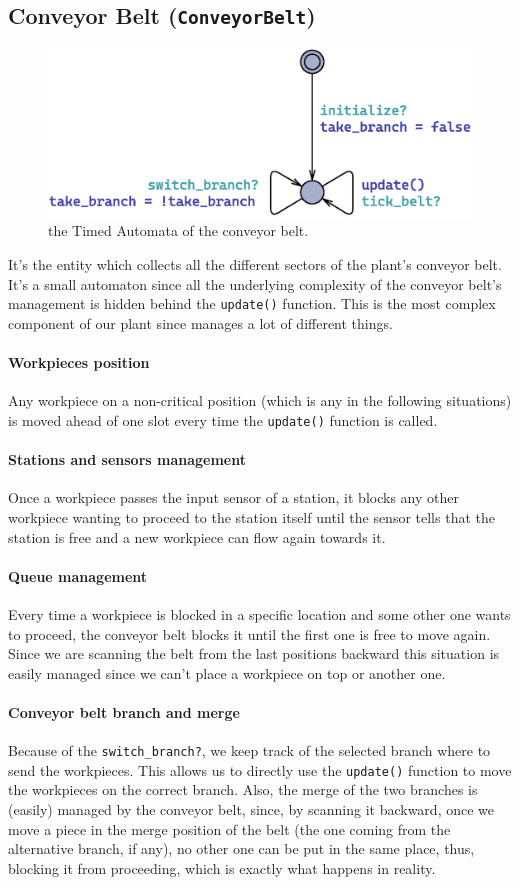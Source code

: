 \documentclass[a4paper]{article}
\begin{document}
    \subsection{Conveyor Belt (\texttt{ConveyorBelt})}

    \begin{figure}[h!]
        \centering
        \includegraphics[width=0.33\columnwidth]{./images/automata/conveyor_belt}
        \caption{the Timed Automata of the conveyor belt.}
    \end{figure}

    It's the entity which collects all the different sectors of the plant's conveyor belt. It's a small automaton since all the underlying complexity of the conveyor belt's management is hidden behind the \texttt{update()} function. This is the most complex component of our plant since manages a lot of different things.

    \paragraph{Workpieces position} Any workpiece on a non-critical position (which is any in the following situations) is moved ahead of one slot every time the \texttt{update()} function is called.

    \paragraph{Stations and sensors management} Once a workpiece passes the input sensor of a station, it blocks any other workpiece wanting to proceed to the station itself until the sensor tells that the station is free and a new workpiece can flow again towards it.

    \paragraph{Queue management} Every time a workpiece is blocked in a specific location and some other one wants to proceed, the conveyor belt blocks it until the first one is free to move again. Since we are scanning the belt from the last positions backward this situation is easily managed since we can't place a workpiece on top or another one.

    \paragraph{Conveyor belt branch and merge} Because of the \texttt{switch\_branch?}, we keep track of the selected branch where to send the workpieces. This allows us to directly use the \texttt{update()} function to move the workpieces on the correct branch. Also, the merge of the two branches is (easily) managed by the conveyor belt, since, by scanning it backward, once we move a piece in the merge position of the belt (the one coming from the alternative branch, if any), no other one can be put in the same place, thus, blocking it from proceeding, which is exactly what happens in reality.
\end{document}
